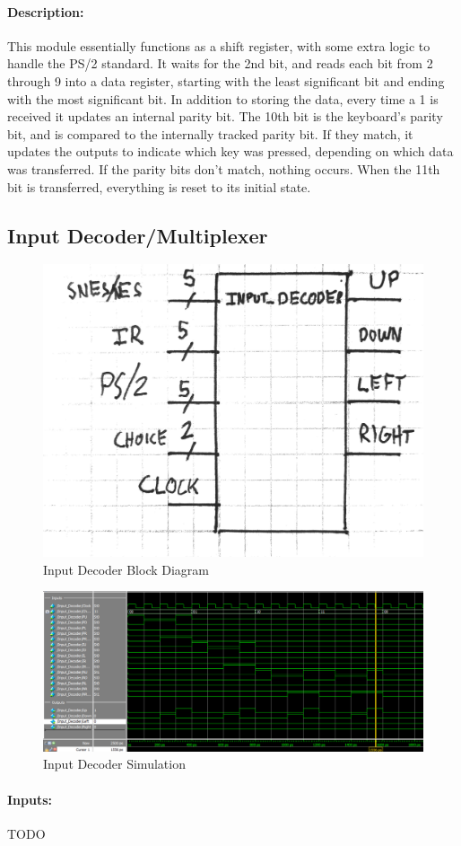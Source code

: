 \documentclass[]{article}
\begin{document}
\paragraph{Description:} This module essentially functions as a shift register, with some extra logic to handle the PS/2 standard.  It waits for the 2nd bit, and reads each bit from 2 through 9 into a data register, starting with the least significant bit and ending with the most significant bit.  In addition to storing the data, every time a 1 is received it updates an internal parity bit.  The 10th bit is the keyboard's parity bit, and is compared to the internally tracked parity bit.  If they match, it updates the outputs to indicate which key was pressed, depending on which data was transferred.  If the parity bits don't match, nothing occurs.  When the 11th bit is transferred, everything is reset to its initial state.

\subsection{Input Decoder/Multiplexer}
\begin{figure}[H]\centering
    \includegraphics[width=0.5\linewidth]{figures/Input_Decoder_Block.jpg}
    \caption{Input Decoder Block Diagram}
    \label{fig:inputDecoderBlock}
\end{figure}
\begin{figure}[H]\centering
    \includegraphics[width=0.5\linewidth]{figures/Input_Decoder_Sim.png}
    \caption{Input Decoder Simulation}
    \label{fig:inputDecoderSum}
\end{figure}
\paragraph{Inputs:} TODO
\end{document}
